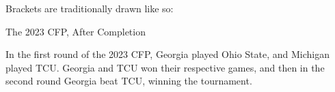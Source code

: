 {Brackets are traditionally drawn like so:


 {The 2023 CFP, After Completion}

In the first round of the 2023 CFP, Georgia played Ohio State, and Michigan played TCU. Georgia and TCU won their respective games, and then in the second round Georgia beat TCU, winning the tournament.









}
